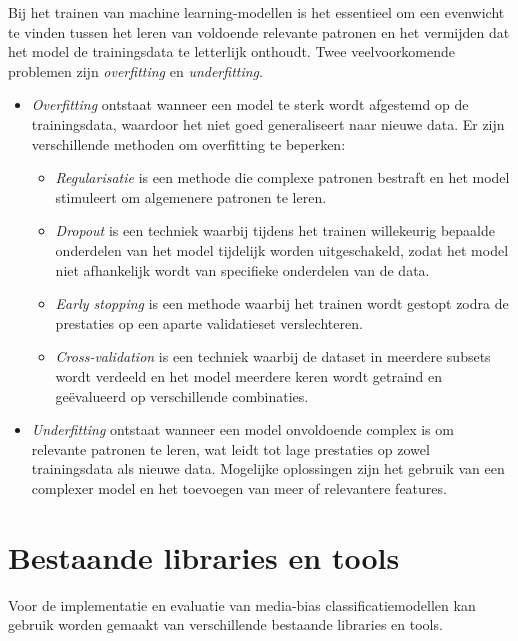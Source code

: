 Bij het trainen van machine learning-modellen is het essentieel om een evenwicht te vinden tussen het leren van voldoende relevante patronen en het vermijden dat het model de trainingsdata te letterlijk onthoudt. Twee veelvoorkomende problemen zijn \textit{overfitting} en \textit{underfitting}.

\begin{itemize}
    \item \textit{Overfitting} ontstaat wanneer een model te sterk wordt afgestemd op de trainingsdata, waardoor het niet goed generaliseert naar nieuwe data. Er zijn verschillende methoden om overfitting te beperken:
    \begin{itemize}
        \item \textit{Regularisatie} is een methode die complexe patronen bestraft en het model stimuleert om algemenere patronen te leren.
        \item \textit{Dropout} is een techniek waarbij tijdens het trainen willekeurig bepaalde onderdelen van het model tijdelijk worden uitgeschakeld, zodat het model niet afhankelijk wordt van specifieke onderdelen van de data.
        \item \textit{Early stopping} is een methode waarbij het trainen wordt gestopt zodra de prestaties op een aparte validatieset verslechteren.
        \item \textit{Cross-validation} is een techniek waarbij de dataset in meerdere subsets wordt verdeeld en het model meerdere keren wordt getraind en geëvalueerd op verschillende combinaties.
    \end{itemize}
    \item \textit{Underfitting} ontstaat wanneer een model onvoldoende complex is om relevante patronen te leren, wat leidt tot lage prestaties op zowel trainingsdata als nieuwe data. Mogelijke oplossingen zijn het gebruik van een complexer model en het toevoegen van meer of relevantere features.
\end{itemize}

\section{Bestaande libraries en tools}
\label{sec:bestaande-libraries-en-tools}

Voor de implementatie en evaluatie van media-bias classificatiemodellen kan gebruik worden gemaakt van verschillende bestaande libraries en tools.


